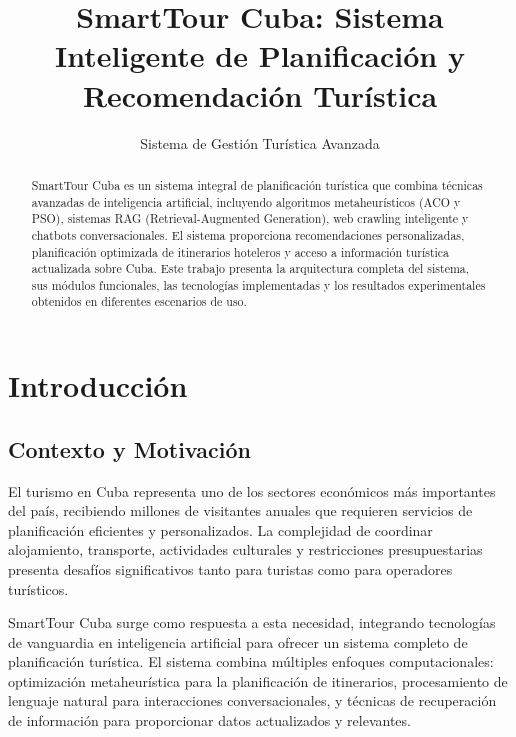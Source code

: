 \documentclass[runningheads]{llncs}
\begin{document}
\title{SmartTour Cuba: Sistema Inteligente de Planificación y Recomendación Turística}

\author{Sistema de Gestión Turística Avanzada}



\maketitle

\begin{abstract}
SmartTour Cuba es un sistema integral de planificación turística que combina técnicas avanzadas de inteligencia artificial, incluyendo algoritmos metaheurísticos (ACO y PSO), sistemas RAG (Retrieval-Augmented Generation), web crawling inteligente y chatbots conversacionales. El sistema proporciona recomendaciones personalizadas, planificación optimizada de itinerarios hoteleros y acceso a información turística actualizada sobre Cuba. Este trabajo presenta la arquitectura completa del sistema, sus módulos funcionales, las tecnologías implementadas y los resultados experimentales obtenidos en diferentes escenarios de uso.

\end{abstract}

\section{Introducción}

\subsection{Contexto y Motivación}

El turismo en Cuba representa uno de los sectores económicos más importantes del país, recibiendo millones de visitantes anuales que requieren servicios de planificación eficientes y personalizados. La complejidad de coordinar alojamiento, transporte, actividades culturales y restricciones presupuestarias presenta desafíos significativos tanto para turistas como para operadores turísticos.

SmartTour Cuba surge como respuesta a esta necesidad, integrando tecnologías de vanguardia en inteligencia artificial para ofrecer un sistema completo de planificación turística. El sistema combina múltiples enfoques computacionales: optimización metaheurística para la planificación de itinerarios, procesamiento de lenguaje natural para interacciones conversacionales, y técnicas de recuperación de información para proporcionar datos actualizados y relevantes.
\end{document}
